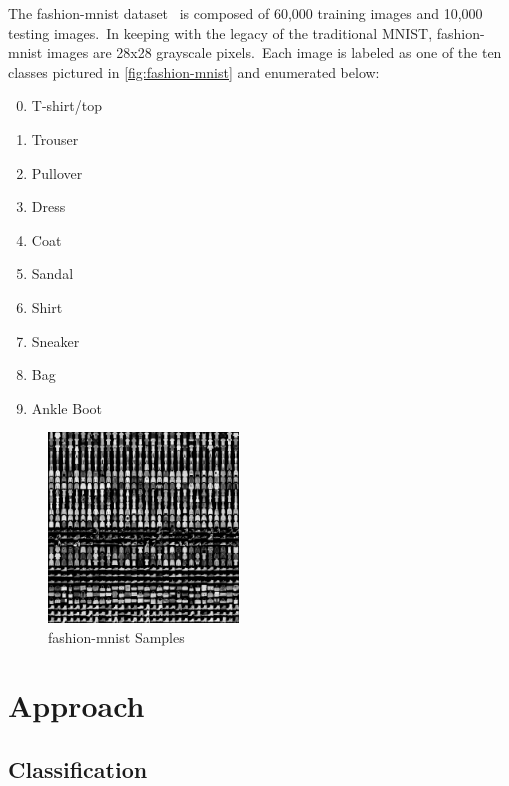 \documentclass[conference]{IEEEtran}
\begin{document}
    The fashion-mnist dataset~\cite{xiao2017/online} is composed of 60,000 training images and 10,000 testing images.\ In keeping with the legacy of the traditional MNIST, fashion-mnist images are 28x28 grayscale pixels.\ Each image is labeled as one of the ten classes pictured in \autoref{fig:fashion-mnist} and enumerated below:

    \begin{enumerate}
        \setcounter{enumi}{-1}
        \item T-shirt/top
        \item Trouser
        \item Pullover
        \item Dress
        \item Coat
        \item Sandal
        \item Shirt
        \item Sneaker
        \item Bag
        \item Ankle Boot
    \end{enumerate}

    \begin{figure}
        \caption{fashion-mnist Samples}
        \label{fig:fashion-mnist}
        \begin{center}
            \includegraphics[width=0.45\textwidth]{data.png}
        \end{center}
    \end{figure}

    \section{Approach}\label{sec:approach}

    \subsection{Classification}\label{subsec:approach-classification}
\end{document}

